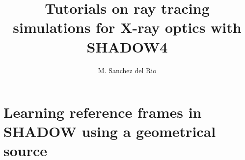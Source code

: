 \documentclass{ol-softwaremanual}
\title{Tutorials on ray tracing simulations for X-ray optics with SHADOW4}
\author{M. Sanchez del Rio}
\begin{document}
\maketitle

\tableofcontents

\newpage
\section{Learning reference frames in SHADOW using a geometrical source}


\end{document}
